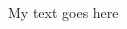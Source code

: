 \documentclass{article}
\date{\today}
\begin{document}
\maketitle

\begin{multicols}{3}


My text goes here

\lipsum[100]

\closearticle

\end{multicols}
\end{document}
